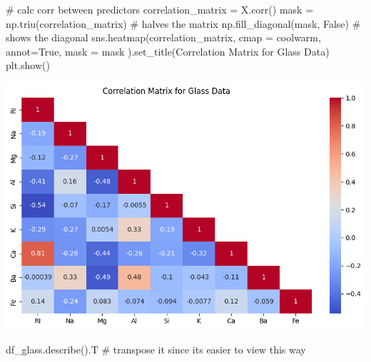 \documentclass[
  11pt,
]{article}
\newenvironment{Shaded}{\begin{snugshade}}{\end{snugshade}}
\newcommand{\CommentTok}[1]{\textcolor[rgb]{0.37,0.37,0.37}{#1}}
\newcommand{\NormalTok}[1]{\textcolor[rgb]{0.00,0.23,0.31}{#1}}
\newcommand{\OperatorTok}[1]{\textcolor[rgb]{0.37,0.37,0.37}{#1}}
\newcommand{\StringTok}[1]{\textcolor[rgb]{0.13,0.47,0.30}{#1}}
\newcommand{\VariableTok}[1]{\textcolor[rgb]{0.07,0.07,0.07}{#1}}
\begin{document}
\begin{Shaded}
\begin{Highlighting}[]
\CommentTok{\# calc corr between predictors}
\NormalTok{correlation\_matrix }\OperatorTok{=}\NormalTok{ X.corr()}
\NormalTok{mask }\OperatorTok{=}\NormalTok{ np.triu(correlation\_matrix) }\CommentTok{\# halves the matrix }
\NormalTok{np.fill\_diagonal(mask, }\VariableTok{False}\NormalTok{) }\CommentTok{\# shows the diagonal }
\NormalTok{sns.heatmap(correlation\_matrix, cmap }\OperatorTok{=} \StringTok{\textquotesingle{}coolwarm\textquotesingle{}}\NormalTok{, annot}\OperatorTok{=}\VariableTok{True}\NormalTok{, mask }\OperatorTok{=}\NormalTok{ mask ).set\_title(}\StringTok{\textquotesingle{}Correlation Matrix for Glass Data\textquotesingle{}}\NormalTok{)}
\NormalTok{plt.show()}
\end{Highlighting}
\end{Shaded}

\includegraphics{hw4_files/figure-pdf/cell-7-output-1.png}

\begin{Shaded}
\begin{Highlighting}[]
\NormalTok{df\_glass.describe().T }\CommentTok{\# transpose it since its easier to view this way}
\end{Highlighting}
\end{Shaded}
\end{document}
